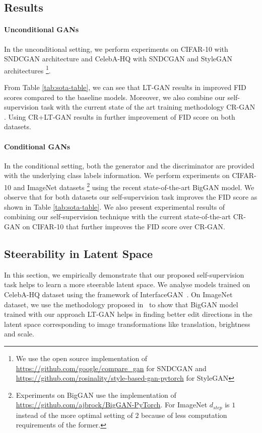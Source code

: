 \documentclass[10pt,twocolumn,letterpaper]{article}
\begin{document}
\subsection{Results}

\paragraph{Unconditional GANs}
In the unconditional setting, we perform experiments on CIFAR-10 with SNDCGAN \cite{sngan_proj} architecture and CelebA-HQ with SNDCGAN and StyleGAN \cite{stylegan2019karras} architectures \footnote{We use the open source implementation of \url{https://github.com/google/compare\_gan} for SNDCGAN and \url{https://github.com/rosinality/style-based-gan-pytorch} for StyleGAN}. 

From Table \ref{tab:sota-table}, we can see that LT-GAN results in improved FID scores compared to the baseline models. Moreover, we also combine our self-supervision task with the current state of the art training methodology CR-GAN \cite{crgan2019chen}. Using CR+LT-GAN results in further improvement of FID score on both datasets.




\paragraph{Conditional GANs}
In the conditional setting, both the generator and the discriminator are provided with the underlying class labels information. We perform experiments on CIFAR-10 and ImageNet datasets \footnote{Experiments on BigGAN use the implementation of  \url{https://github.com/ajbrock/BigGAN-PyTorch}. For ImageNet $d_{step}$ is $1$ instead of the more optimal setting of $2$ \cite{biggan2018brock} because of less computation requirements of the former.} using the recent state-of-the-art BigGAN \cite{biggan2018brock} model. We observe that for both datasets our self-supervision task improves the FID score as shown in Table \ref{tab:sota-table}. We also present experimental results of combining our self-supervision technique with the current state-of-the-art CR-GAN \cite{crgan2019chen} on CIFAR-10 that further improves the FID score over CR-GAN.









\subsection{Steerability in Latent Space}
In this section, we empirically demonstrate that our proposed self-supervision task helps to learn a more steerable latent space. We analyse models trained on CelebA-HQ dataset using the framework of InterfaceGAN~\cite{interface2020shen}. On ImageNet dataset, we use the methodology proposed in~\cite{controlling2020iclr} to show that BigGAN model \cite{biggan2018brock} trained with our approach LT-GAN helps in finding better edit directions in the latent space corresponding to image transformations like translation, brightness and scale.
\end{document}
